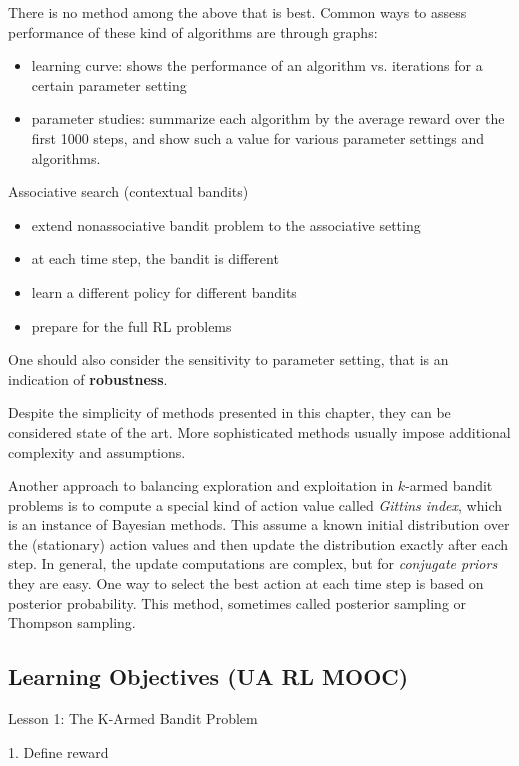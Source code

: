 \documentclass[sutton_barto_notes.tex]{subfiles}
\begin{document}
There is no method among the above that is best. Common ways to assess performance of these kind of algorithms are through graphs:
\begin{itemize}
\item learning curve: shows the performance of an algorithm vs. iterations for a certain parameter setting
\item parameter studies: summarize each algorithm by the average reward over the first 1000 steps, and show such a value for various parameter settings and algorithms.
\end{itemize}

Associative search (contextual bandits)
\begin{itemize}
\item extend nonassociative bandit problem to the associative setting
\item at each time step, the bandit is different
\item learn a different policy for different bandits 
\item prepare for the full RL problems
\end{itemize}

One should also consider the sensitivity to parameter setting, that is an indication of \textbf{robustness}.

Despite the simplicity of methods presented in this chapter, they can be considered state of the art. More sophisticated methods usually impose additional complexity and assumptions.

Another approach to balancing exploration and exploitation in $k$-armed bandit problems is to compute a special kind of action value called \textit{Gittins index}, which is an instance of Bayesian methods. This assume a known initial distribution over the (stationary) action values and then update the distribution exactly after each step.
In general, the update computations are complex, but for \textit{conjugate priors} they are easy.
One way to select the best action at each time step is based on posterior probability.
This method, sometimes called posterior sampling or Thompson sampling.

\newpage
\subsection{Learning Objectives (UA RL MOOC)}

Lesson 1: The K-Armed Bandit Problem

1. Define reward
\end{document}
